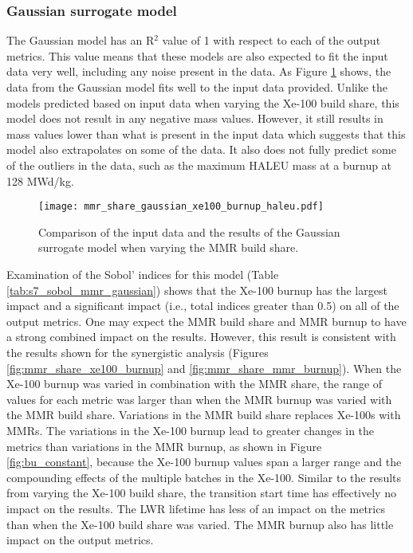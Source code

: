 \subsubsection{Gaussian surrogate model}
The Gaussian model has an R$^2$ value of 1 with respect to each of the output 
metrics. This value means that these models are also expected to fit the input 
data very well, including any noise present in the data. As Figure 
\ref{fig:s7_mmr_gaussian} shows, the data from the Gaussian model fits well 
to the input data provided. Unlike the models predicted based on input data when 
varying the Xe-100 build share, this model does not result in any negative 
mass values. However, it still results in mass values lower than what is 
present in the input data which suggests that this model also extrapolates 
on some of the data. It also does not fully predict some of the outliers in 
the data, such as the maximum \gls{HALEU} mass at a burnup at 128 MWd/kg.

\begin{figure}[h!]
    \centering 
    \texttt{[image: mmr\_share\_gaussian\_xe100\_burnup\_haleu.pdf]}
    \caption{Comparison of the input data and the results of the Gaussian 
    surrogate model when varying the MMR build share.}
    \label{fig:s7_mmr_gaussian}
\end{figure}

Examination of the Sobol' indices for this model (Table \ref{tab:s7_sobol_mmr_gaussian})
shows that the Xe-100 burnup has the largest impact and a significant impact (i.e., 
total indices greater than 0.5) on all of the 
output metrics. One may expect the \gls{MMR} 
build share and \gls{MMR} burnup to have a strong combined impact on 
the results. However, this result is consistent with the results 
shown for the synergistic analysis (Figures \ref{fig:mmr_share_xe100_burnup} and 
\ref{fig:mmr_share_mmr_burnup}). When the Xe-100 burnup was varied in combination 
with the \gls{MMR} share, the range of values for each metric was larger than 
when the \gls{MMR} burnup was varied with the \gls{MMR} build share. Variations 
in the \gls{MMR} build share replaces Xe-100s with \glspl{MMR}. The variations 
in the Xe-100 burnup lead to greater changes in the metrics than variations 
in the \gls{MMR} burnup, as shown in Figure \ref{fig:bu_constant}, because 
the Xe-100 burnup values span a larger range and the compounding effects of the 
multiple batches in the Xe-100. 
Similar to the results from varying the Xe-100 build share, the 
transition start time has effectively no impact on the results. The \gls{LWR} 
lifetime has less of an impact on the metrics than when the Xe-100 
build share was varied. The \gls{MMR} burnup also has little impact on the 
output metrics. 

